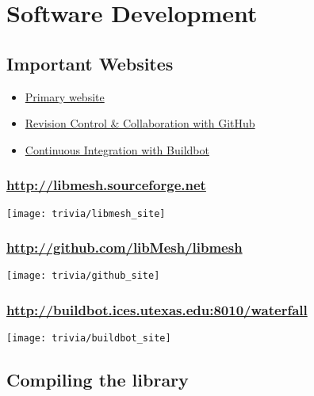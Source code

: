 \section{Software Development}
\subsection{Important Websites}
\frame
{
  \Large
  \begin{block}{}
    \begin{itemize}
      \item \href{http://libmesh.sourceforge.net}{Primary website}
      \item \href{http://github.com/libMesh/libmesh}{Revision Control \& Collaboration with GitHub}
      \item \href{http://buildbot.ices.utexas.edu:8010/waterfall}{Continuous Integration with Buildbot}
    \end{itemize}
  \end{block}
}


\frame
{
\frametitle{\url{http://libmesh.sourceforge.net}}

\centerline{\texttt{[image: trivia/libmesh\_site]}}
}


\frame
{
\frametitle{\url{http://github.com/libMesh/libmesh}}

\centerline{\texttt{[image: trivia/github\_site]}}
}


\frame
{
\frametitle{\scriptsize \url{http://buildbot.ices.utexas.edu:8010/waterfall}}

\centerline{\texttt{[image: trivia/buildbot\_site]}}
}



\subsection{Compiling the library}
\frame
{
  \Large
  \begin{block}{}
  \end{block}
}


